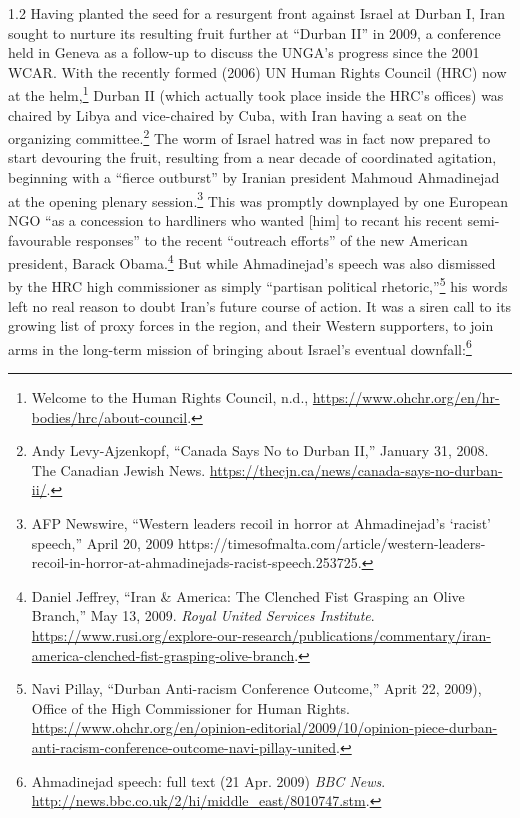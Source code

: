 \documentclass[../unravbook.tex]{subfiles}
\begin{document}
\begin{spacing}{1.2}
Having planted the seed for a resurgent front against Israel at Durban I, Iran sought to nurture its resulting fruit further at ``Durban II'' in 2009, a conference held in Geneva as a follow-up to discuss the UNGA's progress since the 2001 WCAR. With the recently formed (2006) UN Human Rights Council (HRC) now at the helm,\footnote{Welcome to the Human Rights Council, n.d., \url{https://www.ohchr.org/en/hr-bodies/hrc/about-council}.} Durban II (which actually took place inside the HRC's offices) was chaired by Libya and vice-chaired by Cuba, with Iran having a seat on the organizing committee.\footnote{Andy Levy-Ajzenkopf, ``Canada Says No to Durban II,'' January 31, 2008. The Canadian Jewish News. \url{https://thecjn.ca/news/canada-says-no-durban-ii/}.} The worm of Israel hatred was in fact now prepared to start devouring the fruit, resulting from a near decade of coordinated agitation, beginning with a \enquote{fierce outburst} by Iranian president Mahmoud Ahmadinejad at the opening plenary session.\footnote{AFP Newswire, \enquote{Western leaders recoil in horror at Ahmadinejad's \enquote{racist} speech,} April 20, 2009
https://timesofmalta.com/article/western-leaders-recoil-in-horror-at-ahmadinejads-racist-speech.253725.} This was promptly downplayed by one European NGO ``as a concession to hardliners who wanted [him] to recant his recent semi-favourable responses'' to the recent ``outreach efforts'' of the new American president, Barack Obama.\footnote{Daniel Jeffrey, ``Iran \& America: The Clenched Fist Grasping an Olive Branch,'' May 13, 2009. \textit{Royal United Services Institute}. \url{https://www.rusi.org/explore-our-research/publications/commentary/iran-america-clenched-fist-grasping-olive-branch}.} But while Ahmadinejad's speech was also dismissed by the HRC high commissioner as simply ``partisan political rhetoric,''\footnote{Navi Pillay, ``Durban Anti-racism Conference Outcome,'' Aprit 22, 2009), Office of the High Commissioner for Human Rights. \url{https://www.ohchr.org/en/opinion-editorial/2009/10/opinion-piece-durban-anti-racism-conference-outcome-navi-pillay-united}.} his words left no real reason to doubt Iran's future course of action. It was a siren call to its growing list of proxy forces in the region, and their Western supporters, to join arms in the long-term mission of bringing about Israel's eventual downfall:\footnote{
Ahmadinejad speech: full text (21 Apr. 2009) \textit{BBC News}. 
\url{http://news.bbc.co.uk/2/hi/middle_east/8010747.stm}.}


\end{spacing}
\end{document}
